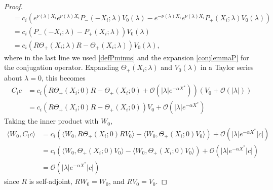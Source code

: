 \documentclass[thesis.tex]{subfiles}
\begin{document}
\begin{lemma}
\begin{proof}
\begin{align*}
&= c_i \left( e^{\nu(\lambda) X_i} e^{\nu(\lambda)X_i} P_-(-X_i; \lambda) V_0(\lambda) - e^{-\nu(\lambda) X_i} e^{\nu(\lambda)X_i} P_+(X_i; \lambda)V_0(\lambda) \right) \\
&= c_i \left( P_-(-X_i; \lambda) - P_+(X_i; \lambda) \right) V_0(\lambda) \\
&= c_i \left( R \Theta_+(X_i; \lambda) R - \Theta_+(X_i; \lambda) \right) V_0(\lambda),
\end{align*}
where in the last line we used \cref{defPminus} and the expansion \cref{conjlemmaP} for the conjugation operator. Expanding $\Theta_+(X_i; \lambda)$ and $V_0(\lambda)$ in a Taylor series about $\lambda = 0$, this becomes
\begin{align*}
C_i c &= c_i \left( R \Theta_+(X_i; 0) R - \Theta_+(X_i; 0) + \mathcal{O}(|\lambda|e^{-\alpha X^*}) \right) (V_0 + \mathcal{O}(|\lambda|)) \\
&= c_i \left( R \Theta_+(X_i; 0) R - \Theta_+(X_i; 0) \right) V_0 + \mathcal{O}(|\lambda|e^{-\alpha X^*})
\end{align*}
Taking the inner product with $W_0$,
\begin{align*}
\langle W_0, C_i c \rangle &= c_i \left( \langle W_0, R \Theta_+(X_i; 0) R V_0 \rangle - \langle W_0, \Theta_+(X_i; 0) V_0 \rangle \right) + \mathcal{O}(|\lambda|e^{-\alpha X^*}|c|) \\
&= c_i \left( \langle W_0, \Theta_+(X_i; 0) V_0 \rangle - \langle W_0, \Theta_+(X_i; 0) V_0 \rangle \right) + \mathcal{O}(|\lambda|e^{-\alpha X^*}|c|) \\
&= \mathcal{O}(|\lambda|e^{-\alpha X^*}|c|) 
\end{align*}
since $R$ is self-adjoint, $RW_0 = W_0$, and $RV_0 = V_0$. 


\end{proof}
\end{lemma}
\end{document}
